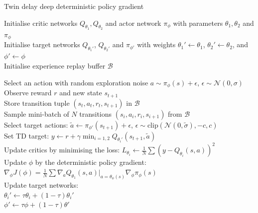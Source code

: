 \begin{algorithm}[hbt!]
\caption{Twin delay deep deterministic policy gradient}\label{alg:td3}
Initialise critic networks $Q_{\theta_1}, Q_{\theta_2}$ and actor network $\pi_\phi$ 
with parameters $\theta_1, \theta_2$ and $\pi_\phi$ \\
Initialise target networks $Q_{\theta_1'}$, $Q_{\theta_2'}$ and $\pi_{\phi'}$ with weights 
$\theta_1' \leftarrow \theta_1$, $\theta_2' \leftarrow \theta_2$, and $\phi' \leftarrow \phi$ \\
Initialise experience replay buffer $\mathcal{B}$ \\
{

    {
        Select an action with random exploration noise $a \sim \pi_{\phi}(s) + \epsilon$, $\epsilon \sim \mathcal{N}(0, \sigma)$ \\
        Observe reward $r$ and new state $s_{t+1}$ \\
        Store transition tuple $(s_t,a_t,r_t,s_{t+1})$ in $\mathcal{B}$ \\
        
        Sample mini-batch of $N$ transitions $(s_i,a_i,r_i,s_{i+1})$ from $\mathcal{B}$ \\
        Select target actions: \hspace{5cm}
        $\tilde{a} \leftarrow \pi_{\phi'}(s_{t+1}) + \epsilon$, $\epsilon \sim \text{clip}(\mathcal{N}(0,\tilde{\sigma}), -c,c)$ \\
        Set TD target: \hspace{5cm}
        $y \leftarrow r + \gamma \min_{i=1,2} Q_{\theta_i'}(s_{t+1}, \tilde{a})$ \\
        Update critics by minimising the loss: \hspace{5cm}
        $L_{\theta_i} \leftarrow  \frac{1}{N} \sum (y - Q_{\theta_i}(s,a))^{2} $ \\
        {
            Update $\phi$ by the deterministic policy gradient:
            $\nabla_\phi J(\phi) = \frac{1}{N} \sum \nabla_a Q_{\theta_1} (s,a) | _{a=\theta_\phi(s)} \nabla_\phi \pi_\phi(s)$ \\
            Update target networks: \\
            $\theta_{i}' \leftarrow \tau \theta_i + (1 - \tau) \theta_{i}'$ \\
            $\phi' \leftarrow \tau \phi + (1 - \tau) \theta'$ \\
        }
    }
}
\end{algorithm}

